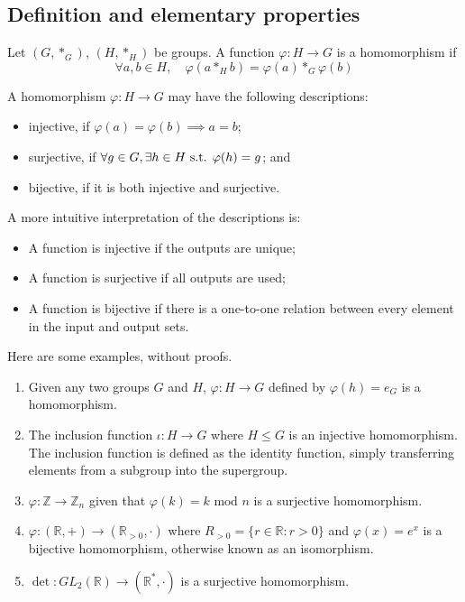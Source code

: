 \subsection{Definition and elementary properties}
\begin{definition}
	Let \((G, \ast_G)\), \((H, \ast_H)\) be groups.
	A function \(\varphi: H \to G\) is a homomorphism if
	\[
		\forall a, b \in H,\quad \varphi(a \ast_H b) = \varphi(a) \ast_G \varphi(b)
	\]
\end{definition}
A homomorphism \(\varphi: H \to G\) may have the following descriptions:
\begin{itemize}
	\item injective, if \(\varphi(a) = \varphi(b) \implies a = b\);
	\item surjective, if \(\forall g \in G, \exists h \in H \text{ s.t. } \varphi(h) = g\); and
	\item bijective, if it is both injective and surjective.
\end{itemize}
A more intuitive interpretation of the descriptions is:
\begin{itemize}
	\item A function is injective if the outputs are unique;
	\item A function is surjective if all outputs are used;
	\item A function is bijective if there is a one-to-one relation between every element in the input and output sets.
\end{itemize}
Here are some examples, without proofs.
\begin{enumerate}
	\item Given any two groups \(G\) and \(H\), \(\varphi: H \to G\) defined by \(\varphi(h) = e_G\) is a homomorphism.
	\item The inclusion function \(\iota: H \to G\) where \(H \leq G\) is an injective homomorphism.
	      The inclusion function is defined as the identity function, simply transferring elements from a subgroup into the supergroup.
	\item \(\varphi: \mathbb Z \to \mathbb Z_n\) given that \(\varphi(k) = k \text{ mod } n\) is a surjective homomorphism.
	\item \(\varphi: (\mathbb R, +) \to (\mathbb R_{>0}, \cdot)\) where \(R_{>0} = \{r \in \mathbb R : r > 0\}\) and \(\varphi(x) = e^x\) is a bijective homomorphism, otherwise known as an isomorphism.
	\item \(\det : GL_2(\mathbb R) \to (\mathbb R^*, \cdot)\) is a surjective homomorphism.
\end{enumerate}

